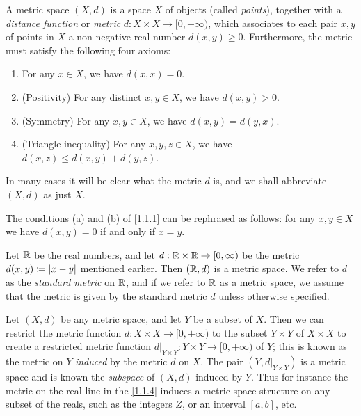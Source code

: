 \begin{defn}\label{1.1.2}
  A metric space \((X, d)\) is a space \(X\) of objects (called \emph{points}), together with a \emph{distance function} or \emph{metric} \(d : X \times X \to [0, +\infty)\), which associates to each pair \(x, y\) of points in \(X\) a non-negative real number \(d(x, y) \geq 0\).
  Furthermore, the metric must satisfy the following four axioms:
  \begin{enumerate}
    \item For any \(x \in X\), we have \(d(x, x) = 0\).
    \item (Positivity) For any distinct \(x, y \in X\), we have \(d(x, y) > 0\).
    \item (Symmetry) For any \(x, y \in X\), we have \(d(x, y) = d(y, x)\).
    \item (Triangle inequality) For any \(x, y, z \in X\), we have \(d(x, z) \leq d(x, y) + d(y, z)\).
  \end{enumerate}
\end{defn}

\begin{note}
  In many cases it will be clear what the metric \(d\) is, and we shall abbreviate \((X, d)\) as just \(X\).
\end{note}

\begin{rmk}\label{1.1.3}
  The conditions (a) and (b) of \cref{1.1.1} can be rephrased as follows:
  for any \(x, y \in X\) we have \(d(x, y) = 0\) if and only if \(x = y\).
\end{rmk}

\begin{eg}\label{1.1.4}
  Let \(\mathbb{R}\) be the real numbers, and let \(d : \mathbb{R} \times \mathbb{R} \to [0, \infty)\) be the metric \(d(x, y) \coloneqq \left\lvert x - y\right\rvert\) mentioned earlier.
  Then \((\mathbb{R}, d)\) is a metric space.
  We refer to \(d\) as the \emph{standard metric} on \(\mathbb{R}\), and if we refer to \(\mathbb{R}\) as a metric space, we assume that the metric is given by the standard metric \(d\) unless otherwise specified.
\end{eg}

\begin{eg}\label{1.1.5}
  Let \((X, d)\) be any metric space, and let \(Y\) be a subset of \(X\).
  Then we can restrict the metric function \(d : X \times X \to [0, +\infty)\) to the subset \(Y \times Y\) of \(X \times X\) to create a restricted metric function \(d|_{Y \times Y} : Y \times Y \to [0, +\infty)\) of \(Y\);
  this is known as the metric on \(Y\) \emph{induced} by the metric \(d\) on \(X\).
  The pair \((Y, d|_{Y \times Y})\) is a metric space and is known the \emph{subspace} of \((X, d)\) induced by \(Y\).
  Thus for instance the metric on the real line in the \cref{1.1.4} induces a metric space structure on any subset of the reals, such as the integers \(Z\), or an interval \([a, b]\), etc.
\end{eg}


